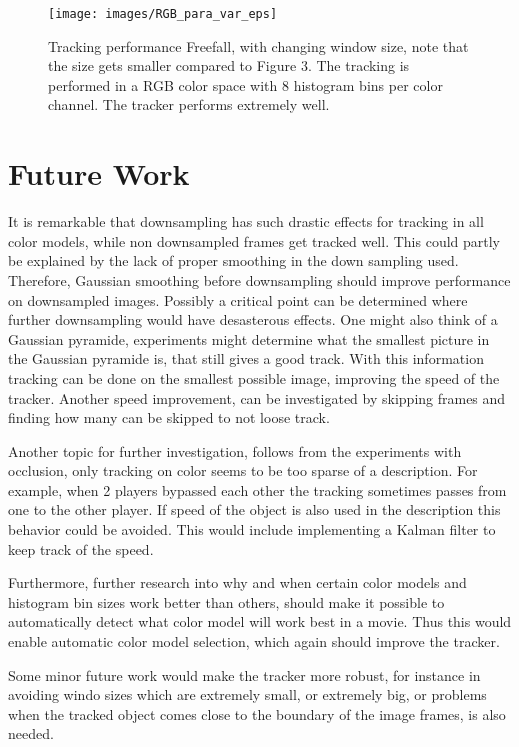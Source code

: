 \documentclass[a4paper,11pt]{article}
\begin{document}
\begin{figure}[!ht]
\label{fig:para_var}
\centering
\texttt{[image: images/RGB\_para\_var\_eps]}
\caption{Tracking performance Freefall, with changing window size, note that the size gets smaller compared to Figure 3. The tracking is performed in a RGB color space with 8 histogram bins per color channel. The tracker performs extremely well.}
\end{figure}

\section{Future Work} \label{sec:fut}
It is remarkable that downsampling has such drastic effects for tracking in all color models, while non downsampled frames get tracked well. This could partly be explained by the lack of proper smoothing in the down sampling used. Therefore, Gaussian smoothing before downsampling should improve performance on downsampled images. Possibly a critical point can be determined where further downsampling would have desasterous effects. One might also think of a Gaussian pyramide, experiments might determine what the smallest picture in the Gaussian pyramide is, that still gives a good track. With this information tracking can be done on the smallest possible image, improving the speed of the tracker. Another speed improvement, can be investigated by skipping frames and finding how many can be skipped to not loose track.
 
Another topic for further investigation, follows from the experiments with occlusion, only tracking on color seems to be too sparse of a description. For example, when 2 players bypassed each other the tracking sometimes passes from one to the other player. If speed of the object is also used in the description this behavior could be avoided. This would include implementing a Kalman filter to keep track of the speed. 

Furthermore, further research into why and when certain color models and histogram bin sizes work better than others, should make it possible to automatically detect what color model will work best in a movie. Thus this would enable automatic color model selection, which again should improve the tracker.

Some minor future work would make the tracker more robust, for instance in avoiding windo sizes which are extremely small, or extremely big, or problems when the tracked object comes close to the boundary of the image frames, is also needed.
\end{document}
